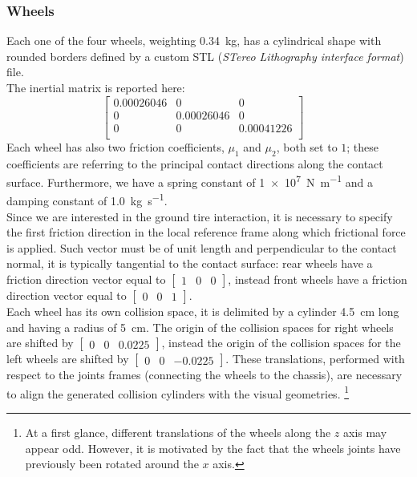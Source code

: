 \subsubsection{Wheels}
Each one of the four wheels, weighting \SI{0.34}{\kilogram}, has a cylindrical shape with rounded borders defined 
by a custom STL (\textit{STereo Lithography interface format}) file. \\
The inertial matrix is reported here: 
$$
\begin{bmatrix}
0.00026046 & 0 & 0 \\
0 & 0.00026046 & 0 \\
0 & 0 & 0.00041226 \\
\end{bmatrix}
\quad
$$
Each wheel has also two friction coefficients, $\mu_{1}$ and $\mu_{2}$, both set to $1$; these coefficients 
are referring to the principal contact directions along the contact surface.
Furthermore, we have a spring constant of \SI[per-mode = symbol]{1e7}{\newton\per\metre} and a 
damping constant of \SI[per-mode = symbol]{1.0}{\kilogram\per\second}. \\
Since we are interested in the ground tire interaction, it is necessary to specify the first friction direction 
in the local reference frame along which frictional force is applied. Such vector must be of unit length and perpendicular 
to the contact normal, it is typically tangential to the contact surface: rear wheels have a friction direction 
vector equal to 
$\left[\begin{smallmatrix} 1 & 0 & 0 \end{smallmatrix}\right]$, instead front wheels have a friction 
direction vector equal to $\left[\begin{smallmatrix} 0 & 0 & 1 \end{smallmatrix}\right]$. \\
Each wheel has its own collision space, it is delimited by a cylinder \SI{4.5}{\cm} long and having a 
radius of \SI{5}{\cm}. The origin of the collision spaces for right wheels are shifted by
 $\left[\begin{smallmatrix} 0 & 0 & 0.0225 \end{smallmatrix}\right]$,
instead the origin of the collision spaces for the left wheels are shifted by
 $\left[\begin{smallmatrix} 0 & 0 & -0.0225 \end{smallmatrix}\right]$.
These translations, performed with respect to the joints frames (connecting the wheels to the chassis), are necessary
to align the generated collision cylinders with the visual geometries.
\footnote{At a first glance, different translations of the wheels along the $z$ axis may appear odd. However, it is motivated by the fact that 
the wheels joints have previously been rotated around the $x$ axis.}

